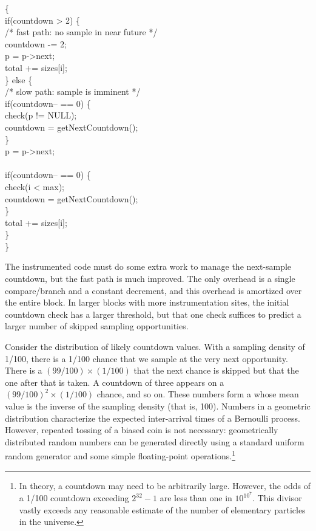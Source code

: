 \begin{code}
  \{\+ \\
  if(countdown > 2) \{ \\
  \> /* fast path: no sample in near future */ \\
  \> countdown -= 2; \\
  \> \up p = p->next; \\
  \> \up total += sizes[i]; \\
  \} else \{ \\
  \> /* slow path: sample is imminent */ \\
  \> if(countdown-- == 0) \{ \\
  \>\> check(p != NULL); \\
  \>\> countdown = getNextCountdown(); \\
  \> \} \\
  \> \up p = p->next; \\
  \> \\
  \> if(countdown-- == 0) \{ \\
  \>\> check(i < max); \\
  \>\> countdown = getNextCountdown(); \\
  \> \} \\
  \> \up total += sizes[i]; \\
  \} \\
  \<\}
\end{code}

The instrumented code must do some extra work to manage the
next-sample countdown, but the fast path is much improved.  The only
overhead is a single compare/branch and a constant decrement, and this
overhead is amortized over the entire block.  In larger blocks with
more instrumentation sites, the initial countdown check has a larger
threshold, but that one check suffices to predict a larger number of
skipped sampling opportunities.

Consider the distribution of likely countdown values.  With a sampling
density of 1/100, there is a 1/100 chance that we sample at the very
next opportunity.  There is a $(99/100) \times (1/100)$ that the next
chance is skipped but that the one after that is taken.  A countdown
of three appears on a $(99/100)^2 \times (1/100)$ chance, and so on.  These
numbers form a  whose mean value is
the inverse of the sampling density (that is, 100).  Numbers in a
geometric distribution characterize the expected inter-arrival times
of a Bernoulli process.  However, repeated tossing of a biased coin is
not necessary: geometrically distributed random numbers can be
generated directly using a standard uniform random generator and some
simple floating-point operations.\footnote{In theory, a countdown may
  need to be arbitrarily large.  However, the odds of a 1/100
  countdown exceeding $2^{32}-1$ are less than one in $10^{10^7}$.
  This divisor vastly exceeds any reasonable estimate of the number of
  elementary particles in the universe.}

